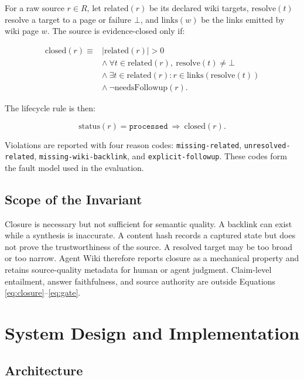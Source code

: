 \documentclass[preprint,12pt,a4paper]{elsarticle}
\begin{document}
For a raw source $r \in R$, let $\mathrm{related}(r)$ be its declared wiki
targets, $\mathrm{resolve}(t)$ resolve a target to a page or failure $\bot$,
and $\mathrm{links}(w)$ be the links emitted by wiki page $w$. The source is
evidence-closed only if:

\begin{equation}
\begin{split}
\mathrm{closed}(r) \equiv {} & |\mathrm{related}(r)| > 0 \\
& \land\ \forall t \in \mathrm{related}(r),\ \mathrm{resolve}(t) \neq \bot \\
& \land\ \exists t \in \mathrm{related}(r):
r \in \mathrm{links}(\mathrm{resolve}(t)) \\
& \land\ \neg\mathrm{needsFollowup}(r).
\end{split}
\label{eq:closure}
\end{equation}

The lifecycle rule is then:

\begin{equation}
\mathrm{status}(r)=\texttt{processed}\ \Rightarrow\ \mathrm{closed}(r).
\label{eq:gate}
\end{equation}

Violations are reported with four reason codes: \texttt{missing-related},
\texttt{unresolved-related}, \texttt{missing-wiki-backlink}, and
\texttt{explicit-followup}. These codes form the fault model used in the
evaluation.

\subsection{Scope of the Invariant}

Closure is necessary but not sufficient for semantic quality. A backlink can
exist while a synthesis is inaccurate. A content hash records a captured
state but does not prove the trustworthiness of the source. A resolved target
may be too broad or too narrow. Agent Wiki therefore reports closure as a
mechanical property and retains source-quality metadata for human or agent
judgment. Claim-level entailment, answer faithfulness, and source authority are
outside Equations \ref{eq:closure}--\ref{eq:gate}.

\section{System Design and Implementation}

\subsection{Architecture}
\end{document}
